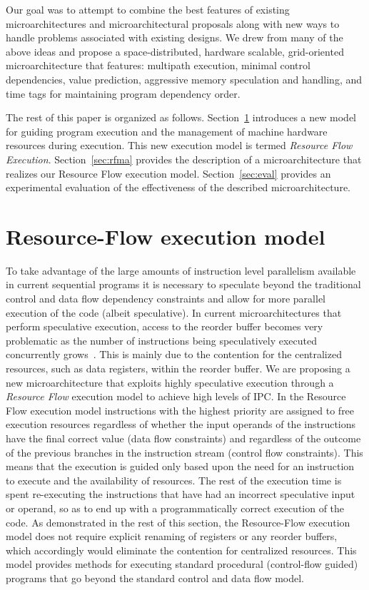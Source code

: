 \documentclass[10pt,twocolumn]{IEEEtran}
\begin{document}
Our goal was to attempt to combine the best features of
existing microarchitectures and microarchitectural proposals
along with new ways to handle problems associated with existing
designs.
We drew from many of the above ideas and propose a
space-distributed, hardware scalable, grid-oriented microarchitecture
that features: multipath execution, minimal control
dependencies, value prediction, aggressive memory speculation and
handling, and time tags for maintaining program dependency order.

The rest of this paper is organized
as follows.
Section~\ref{sec:rfem} introduces a new model for guiding program execution
and the management of machine hardware resources during execution.
This new execution model is termed \emph{Resource Flow Execution}.
Section~\ref{sec:rfma} provides the description of a microarchitecture
that realizes our Resource Flow execution model.
Section~\ref{sec:eval} provides an experimental evaluation of 
the effectiveness of the described microarchitecture.
%
%
%
\section{Resource-Flow execution model}
\label{sec:rfem}
%
To take advantage of the large amounts of instruction level
parallelism available in current sequential programs it is
necessary to speculate beyond the traditional control and data flow
dependency constraints and allow for more
parallel execution of the code (albeit speculative).  
In current microarchitectures that
perform speculative execution, access to the reorder buffer becomes
very problematic as the number of instructions being speculatively
executed concurrently grows~\cite{Palacharla97}.
This is mainly due to the
contention for the centralized resources, such as data registers, within
the reorder buffer.
We are proposing a new microarchitecture that exploits highly speculative
execution through a \emph{Resource Flow} execution model to achieve high
levels of IPC.  
In the Resource Flow execution model instructions
with the highest priority are
assigned to free execution resources regardless
of whether the input operands of the instructions have the f{in}al correct
value (data flow constraints) and regardless of the outcome of the
previous branches in the instruction stream (control flow constraints).
This means that the execution is guided
only based upon the need for an instruction to execute and
the availability of resources.  The rest of the execution
time is spent re-executing the instructions that have had an incorrect
speculative input or operand, so as to end up with a programmatically
correct execution of the code.  As demonstrated in the rest of this
section, the Resource-Flow execution model does not require
explicit renaming of registers or any reorder buffers, which accordingly
would eliminate the contention for centralized resources.
This model provides methods for executing standard procedural (control-flow
guided) programs
that go beyond the standard control and data flow model.
\end{document}
